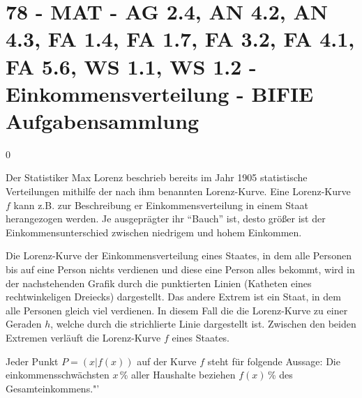 \section{78 - MAT - AG 2.4, AN 4.2, AN 4.3, FA 1.4, FA 1.7, FA 3.2, FA 4.1, FA 5.6, WS 1.1, WS 1.2 - Einkommensverteilung - BIFIE Aufgabensammlung}

\begin{langesbeispiel} \item[0] %
	
Der Statistiker Max Lorenz beschrieb bereits im Jahr 1905 statistische Verteilungen mithilfe der nach ihm benannten Lorenz-Kurve. Eine Lorenz-Kurve $f$ kann z.B. zur Beschreibung er Einkommensverteilung in einem Staat herangezogen werden. Je ausgeprägter ihr "`Bauch"' ist, desto größer ist der Einkommensunterschied zwischen niedrigem und hohem Einkommen.

Die Lorenz-Kurve der Einkommensverteilung eines Staates, in dem alle Personen bis auf eine Person nichts verdienen und diese eine Person alles bekommt, wird in der nachstehenden Grafik durch die punktierten Linien (Katheten eines rechtwinkeligen Dreiecks) dargestellt. Das andere Extrem ist ein Staat, in dem alle Personen gleich viel verdienen. In diesem Fall die die Lorenz-Kurve zu einer Geraden $h$, welche durch die strichlierte Linie dargestellt ist. Zwischen den beiden Extremen verläuft die Lorenz-Kurve $f$ eines Staates.\leer

Jeder Punkt $P=(x|f(x))$ auf der Kurve $f$ steht für folgende Aussage: Die einkommensschwächsten $x$\,\% aller Haushalte beziehen $f(x)$\,\% des Gesamteinkommens."'

\begin{center}
\end{center}


\end{langesbeispiel}
